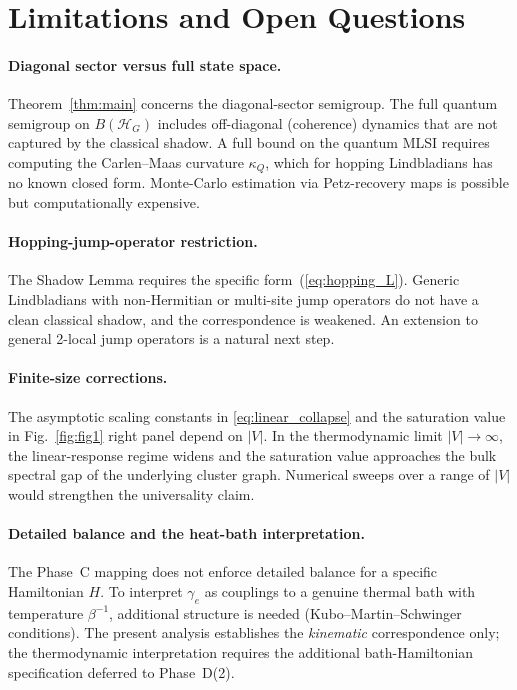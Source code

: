 \documentclass[11pt,letterpaper]{article}
\theoremstyle{definition}
\theoremstyle{remark}
\newcommand{\Hil}{\mathcal{H}}
\begin{document}
\section{Limitations and Open Questions}
\label{sec:limits}

\paragraph{Diagonal sector versus full state space.}
Theorem~\ref{thm:main} concerns the diagonal-sector semigroup. The full
quantum semigroup on $B(\Hil_G)$ includes off-diagonal (coherence) dynamics
that are not captured by the classical shadow. A full bound on the quantum
MLSI requires computing the Carlen--Maas curvature $\kappa_Q$, which for
hopping Lindbladians has no known closed form. Monte-Carlo estimation via
Petz-recovery maps is possible but computationally expensive.

\paragraph{Hopping-jump-operator restriction.}
The Shadow Lemma requires the specific form~(\ref{eq:hopping_L}). Generic
Lindbladians with non-Hermitian or multi-site jump operators do not have a
clean classical shadow, and the correspondence is weakened. An extension
to general 2-local jump operators is a natural next step.

\paragraph{Finite-size corrections.}
The asymptotic scaling constants in \eqref{eq:linear_collapse} and the
saturation value in Fig.~\ref{fig:fig1} right panel depend on $|V|$.
In the thermodynamic limit $|V|\to\infty$, the linear-response regime
widens and the saturation value approaches the bulk spectral gap of the
underlying cluster graph. Numerical sweeps over a range of $|V|$ would
strengthen the universality claim.

\paragraph{Detailed balance and the heat-bath interpretation.}
The Phase~C mapping does not enforce detailed balance for a specific
Hamiltonian $H$. To interpret $\gamma_e$ as couplings to a genuine
thermal bath with temperature $\beta^{-1}$, additional structure is needed
(Kubo--Martin--Schwinger conditions). The present analysis establishes the
\emph{kinematic} correspondence only; the thermodynamic interpretation
requires the additional bath-Hamiltonian specification deferred to
Phase~D(2).
\end{document}
